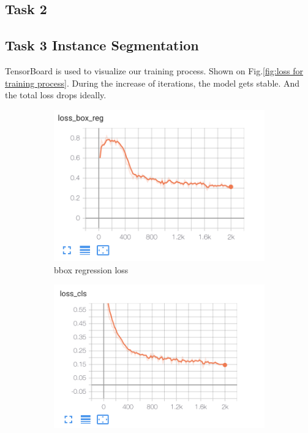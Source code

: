 \documentclass[conference]{IEEEtran}
\begin{document}
\subsection{Task 2}

\subsection{Task 3 Instance Segmentation}

TensorBoard is used to visualize our training process.
Shown on Fig.\ref{fig:loss for training process}.
During the increase of iterations, the model gets stable.
And the total loss drops ideally.

\begin{figure}[h!]
\centering
\begin{subfigure}[h!]{0.24\textwidth}
    \centering
    \includegraphics[width=\textwidth]{img/loss_bbox_reg.png}
    \caption{bbox regression loss}
    \label{fig:loss_bbox}
\end{subfigure}
\hfill
\begin{subfigure}[h!]{0.24\textwidth}
    \centering
    \includegraphics[width=\textwidth]{img/loss_cls.png}

\end{subfigure}
\end{figure}
\end{document}
